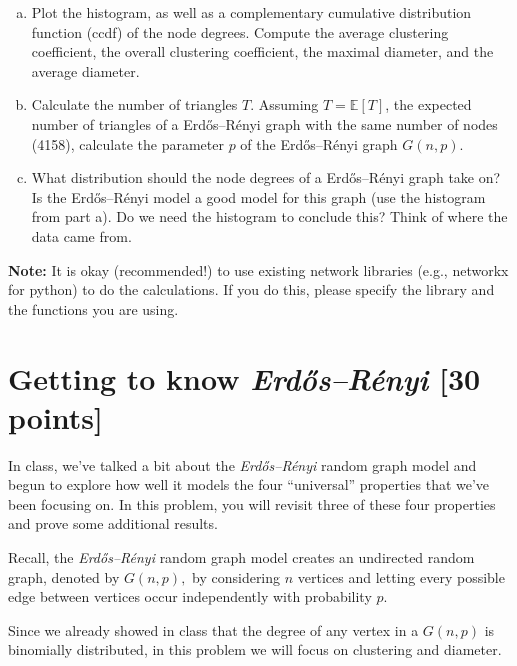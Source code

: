 \documentclass[11pt]{article}
\newcommand{\Exp}[1]{\mathbb{E}\left[#1\right]} %
\begin{document}
\begin{enumerate}[(a)]
\item Plot the histogram, as well as a complementary cumulative distribution function (ccdf) of the node degrees. Compute the average clustering coefficient, the overall clustering coefficient, the maximal diameter, and the average diameter.
\item Calculate the number of triangles $T$. Assuming $T = \Exp T$, the expected number of triangles of a Erd\H{o}s--R\'{e}nyi graph with the same number of nodes (4158), calculate the parameter $p$ of the Erd\H{o}s--R\'{e}nyi graph $G(n, p)$.
\item What distribution should the node degrees of a Erd\H{o}s--R\'{e}nyi graph take on? Is the Erd\H{o}s--R\'{e}nyi model a good model for this graph (use the histogram from part a). Do we need the histogram to conclude this? Think of where the data came from.

\end{enumerate}

{\bf Note:} It is okay (recommended!) to use existing network libraries (e.g., networkx for python) to do the calculations.  If you do this, please specify the library and the functions you are using.


\section{{Getting to know \em Erd\H{o}s--R\'{e}nyi} [30 points]}


In class, we've talked a bit about the {\em Erd\H{o}s--R\'{e}nyi}
random graph model and begun to explore how well it models the four
``universal'' properties that we've been focusing on.  In this
problem, you will revisit three of these four properties and prove
some additional results.

Recall, the {\em Erd\H{o}s--R\'{e}nyi}
random graph model creates an undirected random graph, denoted by
$G(n,p),$ by considering $n$ vertices and letting every possible
edge between vertices occur independently with probability $p$.

Since we already showed in class that the degree of any vertex in a $G(n, p)$ is binomially distributed, in this problem we will focus on clustering and diameter.
\end{document}
